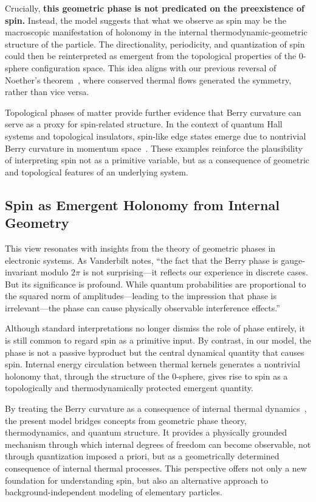 \documentclass[%
 reprint,
 amsmath,amssymb,
 aps,
]{revtex4-1}
\numberwithin{equation}{section}%
\begin{document}
Crucially, \textbf{this geometric phase is not predicated on the preexistence of spin.} Instead, the model suggests that what we observe as spin may be the macroscopic manifestation of holonomy in the internal thermodynamic-geometric structure of the particle. The directionality, periodicity, and quantization of spin could then be reinterpreted as emergent from the topological properties of the 0-sphere configuration space. This idea aligns with our previous reversal of Noether's theorem~\cite{hanamura2506.0119}, where conserved thermal flows generated the symmetry, rather than vice versa.

Topological phases of matter provide further evidence that Berry curvature can serve as a proxy for spin-related structure. In the context of quantum Hall systems and topological insulators, spin-like edge states emerge due to nontrivial Berry curvature in momentum space~\cite{hasan2010colloquium}. These examples reinforce the plausibility of interpreting spin not as a primitive variable, but as a consequence of geometric and topological features of an underlying system.

\subsection{Spin as Emergent Holonomy from Internal Geometry} \label{subsec:emergent_spin_holonomy}

This view resonates with insights from the theory of geometric phases in electronic systems. As Vanderbilt notes, 
``the fact that the Berry phase is gauge-invariant modulo \(2\pi\) is not surprising—it reflects our experience in discrete cases. But its significance is profound. While quantum probabilities are proportional to the squared norm of amplitudes—leading to the impression that phase is irrelevant—the phase can cause physically observable interference effects.''~\cite{vanderbilt2018berry}

Although standard interpretations no longer dismiss the role of phase entirely, it is still common to regard spin as a primitive input. By contrast, in our model, the phase is not a passive byproduct but the central dynamical quantity that causes spin. Internal energy circulation between thermal kernels generates a nontrivial holonomy that, through the structure of the 0-sphere, gives rise to spin as a topologically and thermodynamically protected emergent quantity.


By treating the Berry curvature as a consequence of internal thermal dynamics~\cite{hanamura2507.0128}, the present model bridges concepts from geometric phase theory, thermodynamics, and quantum structure. It provides a physically grounded mechanism through which internal degrees of freedom can become observable, not through quantization imposed a priori, but as a geometrically determined consequence of internal thermal processes. This perspective offers not only a new foundation for understanding spin, but also an alternative approach to background-independent modeling of elementary particles.
\end{document}
